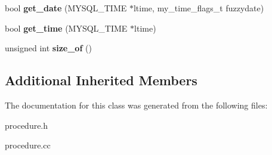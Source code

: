 \begin{DoxyCompactItemize}
\mbox{\label{classItem__proc__int_a2a5ab0d5dd84d3c9705518013ef3d0a4}} 
bool {\bfseries get\+\_\+date} (M\+Y\+S\+Q\+L\+\_\+\+T\+I\+ME $\ast$ltime, my\+\_\+time\+\_\+flags\+\_\+t fuzzydate)
\item 
\mbox{\label{classItem__proc__int_a107ab27a236740a62c1d12974a0a23d7}} 
bool {\bfseries get\+\_\+time} (M\+Y\+S\+Q\+L\+\_\+\+T\+I\+ME $\ast$ltime)
\item 
\mbox{\label{classItem__proc__int_a23c2e8834664c9955b0a102005752b87}} 
unsigned int {\bfseries size\+\_\+of} ()
\end{DoxyCompactItemize}
\subsection*{Additional Inherited Members}


The documentation for this class was generated from the following files\+:\begin{DoxyCompactItemize}
\item 
procedure.\+h\item 
procedure.\+cc\end{DoxyCompactItemize}
